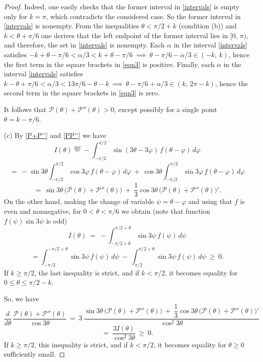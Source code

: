 \documentclass[10pt,a4paper]{amsart}
\newcommand {\PPP}{\mathcal{P}}
\newcommand{\eqdef}{\stackrel{\mathrm{def}}{=}}
\begin{document}
\begin{proof}
Indeed, one easily checks that the former interval in \eqref{intervals} is empty only for $k=\pi$, which contradicts the considered case. So the former interval in \eqref{intervals} is nonempty. From the inequalities $\theta < \pi/2+k$ (condition (b)) and $k< \theta+\pi/6$ one derives that the left endpoint of the former interval lies in $[0,\, \pi)$, and therefore, the set in \eqref{intervals} is nonempty. Each $\alpha$ in the interval \eqref{intervals} satisfies $-k+\theta-\pi/6<\alpha/3<k+\theta-\pi/6\ \implies\ \theta-\pi/6-\alpha/3 \in (-k,\, k)$, hence the first term in the square brackets in \eqref{eqn3} is positive. Finally, each $\alpha$ in the interval \eqref{intervals} satisfies $k-\theta+\pi/6 <\alpha/3< 13\pi/6-\theta-k\ \implies\ \theta-\pi/6+\alpha/3 \in (k,\, 2\pi-k)$, hence the second term in the square brackets in \eqref{eqn3} is zero.

It follows that $\PPP(\theta) + \PPP''(\theta) > 0$, except possibly for a single point $\theta = k - \pi/6$.
	\vspace{2mm}

(c) By \eqref{P+P''} and \eqref{PP''} we have
$$
I(\theta) \eqdef -\int_{-\pi/2}^{\pi/2} \sin(3\theta-3\varphi)\, f(\theta-\varphi)\, d\varphi
$$ $$
=\ -\sin 3\theta \int_{-\pi/2}^{\pi/2} \cos 3\varphi\, f(\theta-\varphi)\, d\varphi\
+\ \cos 3\theta \int_{-\pi/2}^{\pi/2} \sin 3\varphi\, f(\theta-\varphi)\, d\varphi
$$ $$ =\ \sin 3\theta\, \big( \PPP(\theta) + \PPP''(\theta) \big)\
+\ \dfrac{1}{3} \cos 3\theta\, \big( \PPP(\theta) + \PPP''(\theta) \big)'.
$$
On the other hand, making the change of variable $\psi = \theta-\varphi$ and using that $f$ is even and nonnegative, for $0 < \theta < \pi/6$ we obtain (note that function $f(\psi)\sin3\psi$ is odd)
$$
I(\theta)\ =\ -\int_{-\pi/2+\theta}^{\pi/2+\theta} \sin 3\psi\, f(\psi)\, d\psi $$ $$
=	 \int_{-\pi/2}^{-\pi/2+\theta} \sin 3\psi\, f(\psi)\, d\psi
\ -\ \int_{\pi/2}^{\pi/2+\theta} \sin 3\psi\, f(\psi)\, d\psi\ \ge\ 0.
$$
If $k \ge \pi/2$, the last inequality is strict, and if $k < \pi/2$, it becomes equality for $0\le \theta \le \pi/2-k$.

So, we have
$$
\dfrac{d}{d\theta}\, \dfrac{\PPP(\theta) + \PPP''(\theta)}{\cos 3\theta}\ =\ 3\ \dfrac{\sin 3\theta\, \big( \PPP(\theta) + \PPP''(\theta) \big)\
+\ \dfrac{1}{3} \cos 3\theta\, \big( \PPP(\theta) + \PPP''(\theta) \big)'}{\cos^2 3\theta}\ $$ $$ =\ \dfrac{3I(\theta)}{\cos^2 3\theta}\ \ge \ 0.
$$
If $k \ge \pi/2$, this inequality is strict, and if $k < \pi/2$, it becomes equality for $\theta\ge 0$ sufficiently small.
\vspace{2mm}


\end{proof}
\end{document}
